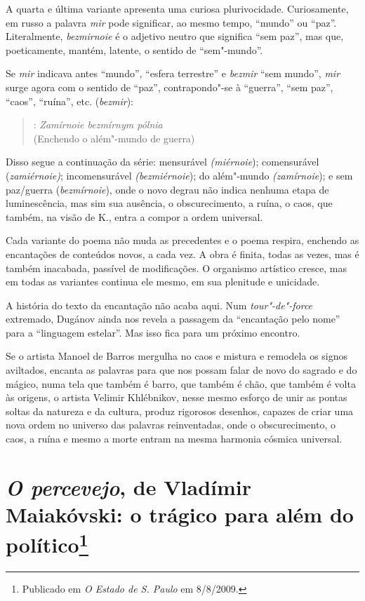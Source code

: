 A quarta e última variante apresenta uma curiosa plurivocidade.
Curiosamente, em russo a palavra \emph{mir} pode significar, ao mesmo
tempo, ``mundo'' ou ``paz''. Literalmente, \emph{bezmirnoie} é o adjetivo
neutro que significa ``sem paz'', mas que, poeticamente, mantém,
latente, o sentido de ``sem"-mundo''.

Se \emph{mir} indicava antes ``mundo'', ``esfera terrestre'' e
\emph{bezmir} ``sem mundo'', \emph{mir} surge agora com o sentido de
``paz'', contrapondo"-se à ``guerra'', ``sem paz'', ``caos'', ``ruína'',
etc. (\emph{bezmir}):

\begin{verse}
: \emph{Zamírnoie bezmírnym pólnia} \\
(Enchendo o além"-mundo de guerra)
\end{verse}

Disso segue a continuação da série: mensurável \emph{(miérnoie});
comensurável (\emph{zamiérnoie)}; incomensurável \emph{(bezmiérnoie});
do além"-mundo \emph{(zamírnoie}); e sem paz/guerra (\emph{bezmírnoie}),
onde o novo degrau não indica nenhuma etapa de luminescência, mas sim
sua ausência, o obscurecimento, a ruína, o caos, que também, na visão de
K., entra a compor a ordem universal.

Cada variante do poema não muda as precedentes e o poema respira,
enchendo as encantações de conteúdos novos, a cada vez. A obra é finita,
todas as vezes, mas é também inacabada, passível de modificações. O
organismo artístico cresce, mas em todas as variantes continua ele
mesmo, em sua plenitude e unicidade.

A história do texto da encantação não acaba aqui. Num
\emph{tour"-de"-force} extremado, Dugánov ainda nos revela a passagem da
``encantação pelo nome'' para a ``linguagem estelar''. Mas isso fica
para um próximo encontro.

Se o artista Manoel de Barros mergulha no caos e mistura e remodela os
signos aviltados, encanta as palavras para que nos possam falar de novo
do sagrado e do mágico, numa tela que também é barro, que também é chão,
que também é volta às origens, o artista Velimir Khlébnikov, nesse mesmo
esforço de unir as pontas soltas da natureza e da cultura, produz
rigorosos desenhos, capazes de criar uma nova ordem no universo das
palavras reinventadas, onde o obscurecimento, o caos, a ruína e mesmo a
morte entram na mesma harmonia cósmica universal.

\chapter{\emph{O percevejo}, de Vladímir Maiakóvski: o trágico para além
do político\footnote{Publicado em \emph{O Estado de S. Paulo} em
  8/8/2009.}}

